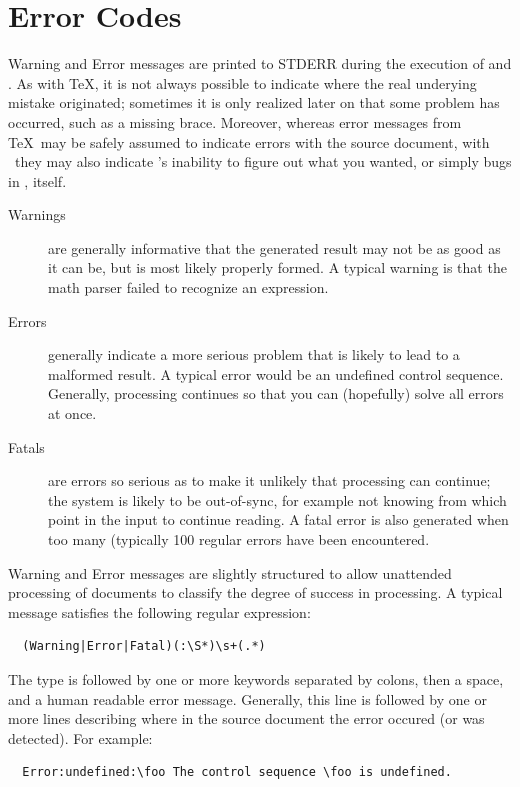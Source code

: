 \documentclass{book}
\begin{document}


\chapter{Error Codes}\label{errorcodes}
Warning and Error messages are printed to STDERR during the execution
of  and .  As with \TeX, it is
not always possible to indicate where the real underying mistake
originated; sometimes it is only realized later on that some problem
has occurred, such as a missing brace. Moreover, whereas error messages
from \TeX\ may be safely assumed to indicate errors with the source
document, with \LaTeXML\ they may also indicate \LaTeXML's inability
to figure out what you wanted, or simply bugs in \LaTeXML, itself.

\begin{description}
\item[Warnings] are generally
informative that the generated result may not be as good as it can be,
but is most likely properly formed.  A typical warning is that
the math parser failed to recognize an expression.
\item[Errors] generally indicate a more serious problem that is likely
to lead to a malformed result.  A typical error would be an undefined
control sequence.  Generally, processing continues so that you can
(hopefully) solve all errors at once.
\item[Fatals] are errors so serious as to make it unlikely that processing
can continue; the system is likely to be out-of-sync, for example
not knowing from which  point in the input to continue reading.
A fatal error is also generated when too many (typically 100 regular errors
have been encountered.
\end{description}

Warning and Error messages are slightly structured to allow
unattended processing of documents to classify the degree
of success in processing. A typical message satisfies the following regular expression:
\begin{verbatim}
  (Warning|Error|Fatal)(:\S*)\s+(.*)
\end{verbatim}
The type is followed by one or more keywords separated by colons,
then a space, and a human readable error message.
Generally, this line is followed by one or more lines describing
where in the source document the error occured (or was detected).
For example:
\begin{verbatim}
  Error:undefined:\foo The control sequence \foo is undefined.
\end{verbatim}
\end{document}
